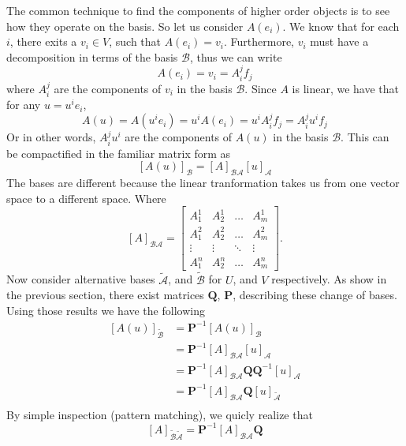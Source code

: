 \documentclass[a4paper]{article}
\begin{document}
The common technique to find the components of higher order objects is to see how they operate on the basis. So let us consider $A(e_i)$. We know that for each $i$, there exits a $v_i \in V$, such that $A(e_i) = v_i$. Furthermore, $v_i$ must have a decomposition in terms of the basis $\mathcal{B}$, thus we can write
\[
  A(e_i) = v_i = A_i^j f_j
\]
where $A_i^j$ are the components of $v_i$ in the basis $\mathcal{B}$. Since $A$ is linear, we have that for any $u = u^i e_i$, 
\[
  A(u) = A(u^ie_i) = u^iA(e_i) = u^i A_i^j f_j = A_i^j u^i f_j
\]
Or in other words, $A^j_iu^i$ are the components of $A(u)$ in the basis $\mathcal{B}$. This can be compactified in the familiar matrix form as
\[
  \left[ A(u) \right]_{\mathcal{B}} = \left[ A \right]_{\mathcal{B}\mathcal{A}} \left[ u \right]_{\mathcal{A}}
\]
The bases are different because the linear tranformation takes us from one vector space to a different space. Where 
\[
  \left[ A \right]_{\mathcal{B}\mathcal{A}} = 
  \begin{bmatrix}
    A_1^1 & A_2^1 & \dots & A_m^1 \\
    A_1^2 & A_2^2 & \dots & A_m^2 \\
    \vdots & \vdots & \ddots & \vdots \\
    A_1^n & A_2^n & \dots & A_m^n
  \end{bmatrix}.
\]
Now consider alternative bases $\widetilde{\mathcal{A}}$, and $\widetilde{\mathcal{B}}$ for $U$, and $V$ respectively. As show in the previous section, there exist matrices $\bm{Q}$, $\bm{P}$, describing these change of bases. Using those results we have the following
\[
  \begin{aligned}
    [A(u)]_{\widetilde{\mathcal{B}}} &= \bm{P}^{-1} \left[ A(u) \right]_{\mathcal{B}}  \\
                                     &= \bm{P}^{-1} \left[ A \right]_{\mathcal{B}\mathcal{A}} \left[ u \right]_{\mathcal{A}} \\
                                     &= \bm{P}^{-1} \left[ A \right]_{\mathcal{B}\mathcal{A}} \bm{Q} \bm{Q}^{-1} \left[ u \right]_{\mathcal{A}} \\
                                     &= \bm{P}^{-1} \left[ A \right]_{\mathcal{B}\mathcal{A}} \bm{Q} \left[ u \right]_{\widetilde{\mathcal{A}}} \\
  \end{aligned}
\]
By simple inspection (pattern matching), we quicly realize that 
\[
  \left[ A  \right]_{\widetilde{\mathcal{B}} \widetilde{\mathcal{A}}} = \bm{P}^{-1}  \left[ A \right]_{\mathcal{B}\mathcal{A}} \bm{Q}
\]
\end{document}
